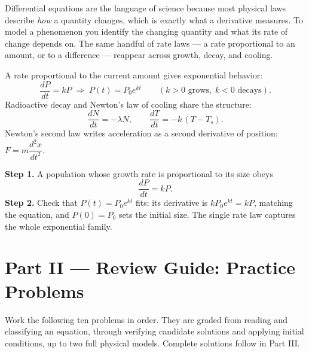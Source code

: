 Differential equations are the language of science because most physical laws
describe \emph{how} a quantity changes, which is exactly what a derivative
measures. To model a phenomenon you identify the changing quantity and what its
rate of change depends on. The same handful of rate laws --- a rate proportional
to an amount, or to a difference --- reappear across growth, decay, and cooling.

\begin{formulabox}
A rate proportional to the current amount gives exponential behavior:
\[
    \frac{dP}{dt} = kP \;\Longrightarrow\; P(t) = P_{0}e^{kt}
    \qquad (k>0 \text{ grows},\; k<0 \text{ decays}).
\]
Radioactive decay and Newton's law of cooling share the structure:
\[
    \frac{dN}{dt} = -\lambda N,
    \qquad
    \frac{dT}{dt} = -k\,(T - T_{s}).
\]
Newton's second law writes acceleration as a second derivative of position:
$F = m\dfrac{d^{2}x}{dt^{2}}$.
\end{formulabox}

\begin{examplebox}
\textbf{Step 1.} A population whose growth rate is proportional to its size
obeys
\[ \frac{dP}{dt} = kP. \]
\textbf{Step 2.} Check that $P(t) = P_{0}e^{kt}$ fits: its derivative is
$kP_{0}e^{kt} = kP$, matching the equation, and $P(0) = P_{0}$ sets the initial
size. The single rate law captures the whole exponential family.
\end{examplebox}

\clearpage
{}
{}
\section*{Part II --- Review Guide: Practice Problems}

Work the following ten problems in order. They are graded from reading and
classifying an equation, through verifying candidate solutions and applying
initial conditions, up to two full physical models. Complete solutions follow
in Part III.

